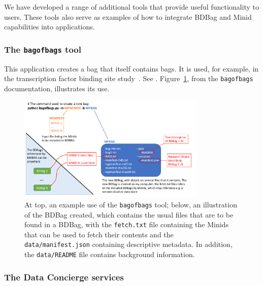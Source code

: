 \documentclass[11pt]{article}
\begin{document}
We have developed a range of additional tools that provide useful functionality to users.
These tools also serve as examples of how to integrate BDBag and Minid
capabilities into applications.

\subsubsection{The \texttt{bagofbags} tool}

This application creates a bag that itself contains bags.
It is used, for example, in the transcription factor
binding site study~\cite{madduri2018reproducible}.
See .
Figure~\ref{fig:bob}, from the \texttt{bagofbags} documentation, illustrates its use.

\begin{figure}
\centering
\includegraphics[width=0.8\textwidth]{figs/MetaBags.png}
\caption{At top, an example use of the \texttt{bagofbags} tool; below, an illustration of the BDBag created, which contains the usual files that are to be found in a BDBag, with the \texttt{fetch.txt} file containing the Minids that can be used to fetch their contents and the \texttt{data/manifest.json} containing descriptive metadata. In addition, the \texttt{data/README} file contains background information.\label{fig:bob}}
\end{figure}

\subsubsection{The Data Concierge services}
\end{document}
